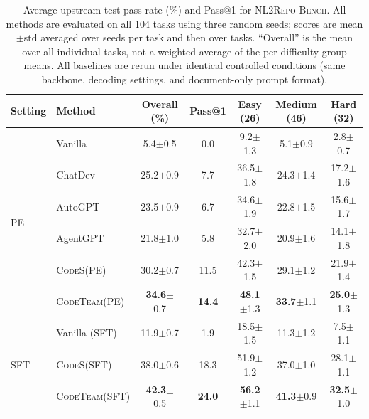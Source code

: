 \documentclass[format=acmsmall, review=false, screen=true]{acmart}
\newcommand{\tool}{\textsc{CodeTeam}\xspace}
\newcommand{\codes}{\textsc{CodeS}\xspace}
\newcommand{\nlrepobench}{\textsc{NL2Repo-Bench}\xspace}
\begin{document}
\begin{table}[t]
\centering
\small
\caption{Average upstream test pass rate (\%) and Pass@1 for \nlrepobench. All methods are evaluated on all 104 tasks using three random seeds; scores are mean$\pm$std averaged over seeds per task and then over tasks. ``Overall'' is the mean over all individual tasks, not a weighted average of the per-difficulty group means. All baselines are rerun under identical controlled conditions (same backbone, decoding settings, and document-only prompt format).}
\label{tab:nl2repo-main}
\begin{tabular}{@{}llccccc@{}}
\toprule
Setting & Method & Overall (\%) & Pass@1 & Easy (26) & Medium (46) & Hard (32) \\
\midrule
\multirow{6}{*}{PE}
  & Vanilla & 5.4{\scriptsize$\pm$0.5} & 0.0 & 9.2{\scriptsize$\pm$1.3} & 5.1{\scriptsize$\pm$0.9} & 2.8{\scriptsize$\pm$0.7} \\
  & ChatDev & 25.2{\scriptsize$\pm$0.9} & 7.7 & 36.5{\scriptsize$\pm$1.8} & 24.3{\scriptsize$\pm$1.4} & 17.2{\scriptsize$\pm$1.6} \\
  & AutoGPT & 23.5{\scriptsize$\pm$0.9} & 6.7 & 34.6{\scriptsize$\pm$1.9} & 22.8{\scriptsize$\pm$1.5} & 15.6{\scriptsize$\pm$1.7} \\
  & AgentGPT & 21.8{\scriptsize$\pm$1.0} & 5.8 & 32.7{\scriptsize$\pm$2.0} & 20.9{\scriptsize$\pm$1.6} & 14.1{\scriptsize$\pm$1.8} \\
  & \codes (PE) & 30.2{\scriptsize$\pm$0.7} & 11.5 & 42.3{\scriptsize$\pm$1.5} & 29.1{\scriptsize$\pm$1.2} & 21.9{\scriptsize$\pm$1.4} \\
  & \tool (PE) & \textbf{34.6}{\scriptsize$\pm$0.7} & \textbf{14.4} & \textbf{48.1}{\scriptsize$\pm$1.3} & \textbf{33.7}{\scriptsize$\pm$1.1} & \textbf{25.0}{\scriptsize$\pm$1.3} \\
\midrule
\multirow{3}{*}{SFT}
  & Vanilla (SFT) & 11.9{\scriptsize$\pm$0.7} & 1.9 & 18.5{\scriptsize$\pm$1.5} & 11.3{\scriptsize$\pm$1.2} & 7.5{\scriptsize$\pm$1.1} \\
  & \codes (SFT) & 38.0{\scriptsize$\pm$0.6} & 18.3 & 51.9{\scriptsize$\pm$1.2} & 37.0{\scriptsize$\pm$1.0} & 28.1{\scriptsize$\pm$1.1} \\
  & \tool (SFT) & \textbf{42.3}{\scriptsize$\pm$0.5} & \textbf{24.0} & \textbf{56.2}{\scriptsize$\pm$1.1} & \textbf{41.3}{\scriptsize$\pm$0.9} & \textbf{32.5}{\scriptsize$\pm$1.0} \\
\bottomrule
\end{tabular}
\end{table}
\end{document}
